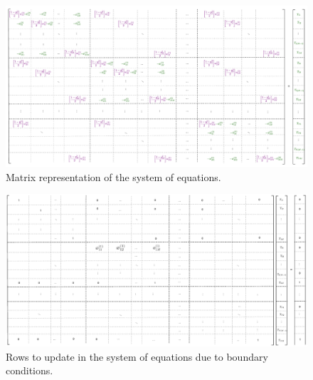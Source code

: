 \begin{landscape}
\thispagestyle{empty}
\begin{figure}
\begin{center}
\includegraphics[width=22cm]{figures/matrixGiantErasedEq}    %
\vspace*{6mm}
\caption{Matrix representation of the system of equations.} 
\label{matrixGiantErasedEq}
\end{center}
\end{figure}
\end{landscape}

\begin{landscape}
\thispagestyle{empty}
\begin{figure}
\begin{center}
\includegraphics[width=22cm]{figures/matrixBoundaries}    %
\vspace*{6mm}
\caption{Rows to update in the system of equations due to boundary conditions.} 
\label{matrixBoundaries}
\end{center}
\end{figure}
\end{landscape}

